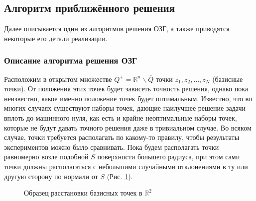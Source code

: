 \documentclass[a4paper]{article}
\newcommand{\R}[1]{\mathbb{R}^#1}
\begin{document}
\subsection{Алгоритм приближённого решения}

Далее описывается один из алгоритмов решения ОЗГ, а также приводятся некоторые его детали реализации.

\subsubsection{Описание алгоритма решения ОЗГ}
Расположим в открытом множестве $Q^+= \R{n}\backslash \bar Q$ точки $z_1,z_2,\dots,z_N$ (базисные точки). От положения этих точек будет зависеть точность решения, однако пока неизвестно, какое именно положение точек будет оптимальным.
Известно, что во многих случаях существуют наборы точек, дающие наилучшее решение задачи вплоть до машинного нуля, как есть и крайне неоптимальные наборы точек, которые не будут давать точного решения даже в тривиальном случае.
Во всяком случае, точки требуется располагать по какому-то правилу, чтобы результаты экспериментов можно было сравнивать.
Пока будем располагать точки равномерно возле подобной $S$ поверхности большего радиуса, при этом сами точки должны располагаться с небольшими случайными отклонениями в ту или другую сторону по нормали от $S$ (Рис. \ref{sample}).

\begin{figure}[!h]
  \noindent{}
  \caption{Образец расстановки базисных точек в $\R{2}$}
  \label{sample}
\end{figure}
\end{document}
